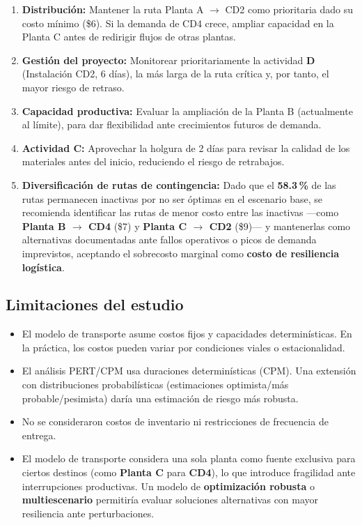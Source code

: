 \documentclass[12pt,a4paper]{article}
\begin{document}
\begin{enumerate}
  \item \textbf{Distribuci\'{o}n:} Mantener la ruta Planta A $\to$ CD2 como prioritaria
  dado su costo m\'{i}nimo (\$6). Si la demanda de CD4 crece, ampliar 
  capacidad en la Planta C antes de redirigir flujos de otras plantas.

  \item \textbf{Gesti\'{o}n del proyecto:} Monitorear prioritariamente la actividad
  \textbf{D} (Instalaci\'{o}n CD2, 6 d\'{i}as), la m\'{a}s larga de la ruta cr\'{i}tica y,
  por tanto, el mayor riesgo de retraso.

  \item \textbf{Capacidad productiva:} Evaluar la ampliaci\'{o}n de la Planta B
  (actualmente al l\'{i}mite), para dar flexibilidad ante crecimientos futuros de demanda.

  \item \textbf{Actividad C:} Aprovechar la holgura de 2 d\'{i}as para revisar la
  calidad de los materiales antes del inicio, reduciendo el riesgo de retrabajos.

  \item \noindent\textbf{Diversificaci\'{o}n de rutas de contingencia:} Dado que el 
  \textbf{58.3\,\%} de las rutas permanecen inactivas por no ser \'{o}ptimas en el 
  escenario base, se recomienda identificar las rutas de menor costo entre las inactivas 
  ---como \textbf{Planta B $\to$ CD4} (\$7) y \textbf{Planta C $\to$ CD2} (\$9)--- y 
  mantenerlas como alternativas documentadas ante fallos operativos o picos de demanda 
  imprevistos, aceptando el sobrecosto marginal como \textbf{costo de resiliencia 
  log\'{i}stica}.
\end{enumerate}

\subsection{Limitaciones del estudio}

\begin{itemize}
  \item El modelo de transporte asume costos fijos y capacidades determin\'{i}sticas.
  En la pr\'{a}ctica, los costos pueden variar por condiciones viales o estacionalidad.
  \item El an\'{a}lisis PERT/CPM usa duraciones determin\'{i}sticas (CPM). Una extensi\'{o}n
  con distribuciones probabil\'{i}sticas (estimaciones optimista/m\'{a}s probable/pesimista)
  dar\'{i}a una estimaci\'{o}n de riesgo m\'{a}s robusta.
  \item No se consideraron costos de inventario ni restricciones de frecuencia de entrega.
  \item El modelo de transporte considera una sola planta como fuente exclusiva para ciertos 
  destinos (como \textbf{Planta C} para \textbf{CD4}), lo que introduce fragilidad ante 
  interrupciones productivas. Un modelo de \textbf{optimizaci\'{o}n 
  robusta} o \textbf{multiescenario} permitir\'{i}a evaluar soluciones alternativas con 
  mayor resiliencia ante perturbaciones.
\end{itemize}
\end{document}
